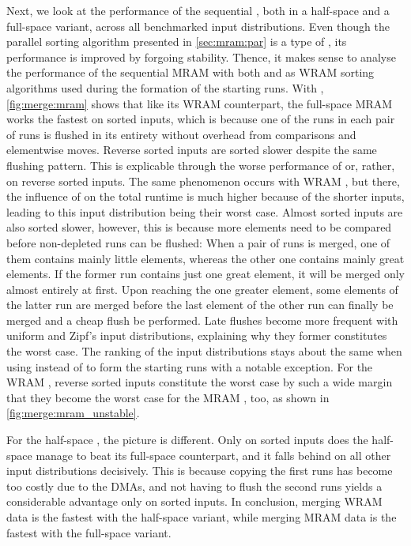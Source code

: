 Next, we look at the performance of the sequential \MS{}, both in a half-space and a full-space variant, across all benchmarked input distributions.
Even though the parallel sorting algorithm presented in \cref{sec:mram:par} is a type of \MS{}, its performance is improved by forgoing stability.
Thence, it makes sense to analyse the performance of the sequential \ac{MRAM} \MS{} with both \QS{} and \MS{} as \ac{WRAM} sorting algorithms used during the formation of the starting runs.
With \QS{}, \cref{fig:merge:mram} shows that like its \ac{WRAM} counterpart, the full-space \ac{MRAM} \MS{} works the fastest on sorted inputs, which is because one of the runs in each pair of runs is flushed in its entirety without overhead from comparisons and elementwise moves.
Reverse sorted inputs are sorted slower despite the same flushing pattern.
This is explicable through the worse performance of \QS{} \Dash or, rather, \IS{} \Dash on reverse sorted inputs.
The same phenomenon occurs with \ac{WRAM} \MS*{}, but there, the influence of \IS{} on the total runtime is much higher because of the shorter inputs, leading to this input distribution being their worst case.
Almost sorted inputs are also sorted slower, however, this is because more elements need to be compared before non-depleted runs can be flushed:
When a pair of runs is merged, one of them contains mainly little elements, whereas the other one contains mainly great elements.
If the former run contains just one great element, it will be merged only almost entirely at first.
Upon reaching the one greater element, some elements of the latter run are merged before the last element of the other run can finally be merged and a cheap flush be performed.
Late flushes become more frequent with uniform and Zipf's input distributions, explaining why they former constitutes the worst case.
The ranking of the input distributions stays about the same when using \MS{} instead of \QS{} to form the starting runs with a notable exception.
For the \ac{WRAM} \MS{}, reverse sorted inputs constitute the worst case by such a wide margin that they become the worst case for the \ac{MRAM} \MS{}, too, as shown in \cref{fig:merge:mram_unstable}.

For the half-space \MS{}, the picture is different.
Only on sorted inputs does the half-space \MS{} manage to beat its full-space counterpart, and it falls behind on all other input distributions decisively.
This is because copying the first runs has become too costly due to the \acp{DMA}, and not having to flush the second runs yields a considerable advantage only on sorted inputs.
In conclusion, merging \ac{WRAM} data is the fastest with the half-space variant, while merging \ac{MRAM} data is the fastest with the full-space variant.
